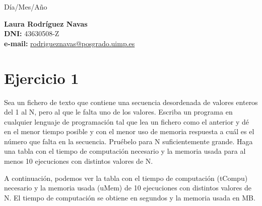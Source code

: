 \documentclass{uimppracticas}
\begin{document}
	
\frontmatter


\begin{center}
	\large Día/Mes/Año
\end{center}

\vspace{30mm}

\begin{flushright}
	{\bf Laura Rodríguez Navas}\\
	\textbf{DNI:} 43630508-Z\\
	\textbf{e-mail:} \href{rodrigueznavas@posgrado.uimp.es}{rodrigueznavas@posgrado.uimp.es}
\end{flushright}

\newpage

\tableofcontents

\newpage

\mainmatter

\section{Ejercicio 1}

Sea un fichero de texto que contiene una secuencia desordenada de valores enteros del 1 al N, pero al que le falta uno de los valores. Escriba un programa en cualquier lenguaje de programación tal que lea un fichero como el anterior y dé en el menor tiempo posible y con el menor uso de memoria respuesta a cuál es el número que falta en la secuencia. Pruébelo para N suficientemente grande. Haga una tabla con el tiempo de computación necesario y la memoria usada para al menos 10 ejecuciones con distintos valores de N.



A continuación, podemos ver la tabla con el tiempo de computación (tCompu) necesario y la memoria usada (uMem) de 10 ejecuciones con distintos valores de N. El tiempo de computación se obtiene en segundos y la memoria usada en MB. 
\end{document}
